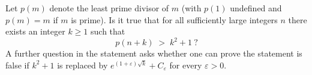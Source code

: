 Let $p(m)$ denote the least prime divisor of $m$ (with $p(1)$ undefined and $p(m)=m$ if $m$ is prime). Is it true that for all sufficiently large integers $n$ there exists an integer $k\ge1$ such that
\[
p(n+k)\;>\;k^{2}+1\ ?
\]
A further question in the statement asks whether one can prove the statement is false if $k^{2}+1$ is replaced by $e^{(1+\varepsilon)\sqrt{k}}+C_{\varepsilon}$ for every $\varepsilon>0$.
